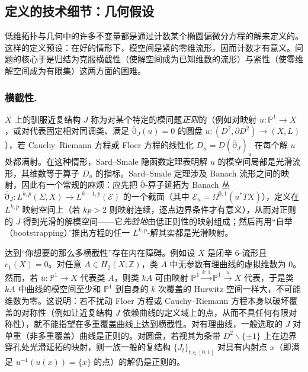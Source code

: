 \documentclass[11pt,a4paper]{article}
\numberwithin{equation}{section}
\newcommand{\bZ}{\mathbb{Z}}
\newcommand{\bP}{\mathbb{P}}
\newcommand{\cdbar}{\mathrm{\overline{\partial}}}
\begin{document}
\subsection{定义的技术细节：几何假设\label{Sec:GeometricHyp}}

低维拓扑与几何中的许多不变量都是通过计数某个椭圆偏微分方程的解来定义的。这样的定义预设：在好的情形下，模空间是紧的零维流形，因而计数才有意义。问题的核心于是归结为克服横截性（使解空间成为已知维数的流形）与紧性（使零维解空间成为有限集）这两方面的困难。

\subsubsection{横截性.} $X$ 上的驯服近复结构 $J$ 称为对某个特定的模问题\emph{正则}的（例如对映射 $u: \bP^1 \rightarrow X$，或对代表固定相对同调类、满足 $\cdbar_J(u) = 0$ 的圆盘 $u: (D^2,\partial D^2) \rightarrow (X,L)$），若 Cauchy–Riemann 方程或 Floer 方程的线性化 $D_u = D(\cdbar_J)_u$ 在每个解 $u$ 处都满射。在这种情形，Sard–Smale 隐函数定理表明解 $u$ 的模空间局部是光滑流形，其维数等于算子 $D_u$ 的指标。Sard–Smale 定理涉及 Banach 流形之间的映射，因此有一个常规的麻烦：应先把 $\cdbar$-算子延拓为 Banach 丛 $\cdbar_J: L^{k,p}(\Sigma, X) \rightarrow L^{k-1,p}(\mathcal{E})$ 的一个截面（其中 $\mathcal{E}_u = \Omega^{0,1}(u^*TX)$），定义在 $L^{k,p}$ 映射空间上（若 $kp>2$ 则映射连续，逐点边界条件才有意义），从而对正则的 $J$ 得到光滑的解模空间——它\emph{先验地}由低正则性的映射组成；然后再用“自举（bootstrapping）”推出方程的任一 $L^{k,p}$-解其实都是光滑映射。

达到“你想要的那么多横截性”存在内在障碍。例如设 $X$ 是闭辛 6-流形且 $c_1(X) =0$。对任意 $A \in H_2(X;\bZ)$，类 $A$ 中无参数有理曲线的虚拟维数为 $0$。然而，若 $u: \bP^1 \rightarrow X$ 代表类 $A$，则类 $kA$ 可由映射 $\bP^1 \stackrel{k:1}{\longrightarrow} \bP^1 \stackrel{u}{\longrightarrow} X$ 代表，于是类 $kA$ 中曲线的模空间至少和 $\bP^1$ 到自身的 $k$ 次覆盖的 Hurwitz 空间一样大，不可能维数为零。这说明：若不扰动 Floer 方程或 Cauchy–Riemann 方程本身以破坏覆盖的对称性（例如让近复结构 $J$ 依赖曲线的定义域上的点，从而不具任何有限对称性），就不能指望在多重覆盖曲线上达到横截性。对有理曲线，一般选取的 $J$ 对单重（非多重覆盖）曲线是正则的。对圆盘，若视其为条带 $D^2 \backslash \{\pm 1\}$ 上在边界穿孔处光滑延拓的映射，则一族一般的复结构 $\{J_t\}_{t\in[0,1]}$ 对具有内射点 $x$（即满足 $u^{-1}(u(x)) = \{x\}$ 的点）的解仍是正则的。
\end{document}
